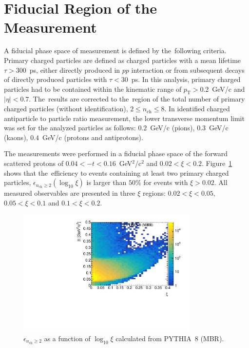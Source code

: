 \section{Fiducial Region of the Measurement}\label{section:star_fiducial}
A fiducial phase space of measurement  is defined by the~following criteria. Primary charged particles are defined as charged particles with a mean lifetime $\tau >300$~ps, either directly produced in $pp$ interaction or from subsequent decays of directly produced particles with $\tau <30$~ps. In this analysis, primary charged particles had to be contained within the kinematic range of $p_\textrm{T}>0.2$~GeV/c and $|\eta|<0.7$.
The~results are corrected to the~region of the total number of primary charged particles (without identification), $2\leq n_\textrm{ch} \leq 8$.  In identified charged antiparticle to particle ratio measurement, the lower transverse momentum limit was set for the analyzed particles as follows: $0.2$~GeV/c (pions), $0.3$~GeV/c (kaons), $0.4$~GeV/c (protons and antiprotons).

The measurements were performed in a fiducial phase space of the forward scattered protons of $0.04<-t<0.16$~GeV$^{2}$/c$^2$ and $0.02 < \xi<0.2$. Figure~\ref{fig:STARtrueMCfiducial} shows that the~efficiency  to events containing at least two primary charged particles, $\epsilon_{n_\textrm{ch}\geq 2}(\log_{10}\xi)$  is larger than $50\%$ for events with $\xi>0.02$. %
All measured observables are presented in three $\xi$ regions: $0.02<\xi<0.05$, $0.05<\xi<0.1$ and $0.1<\xi<0.2$.

\begin{figure}[h!]
	\centering
	\includegraphics[width=0.8\textwidth, page=17]{chapters/dataSampleSTAR/img/true.pdf}
	\caption{$\epsilon_{ n_\textrm{ch} \geq 2}$ as a function of $\log_{10}\xi$ calculated from PYTHIA~8 (MBR).}
	\label{fig:STARtrueMCfiducial}
\end{figure}

\FloatBarrier
